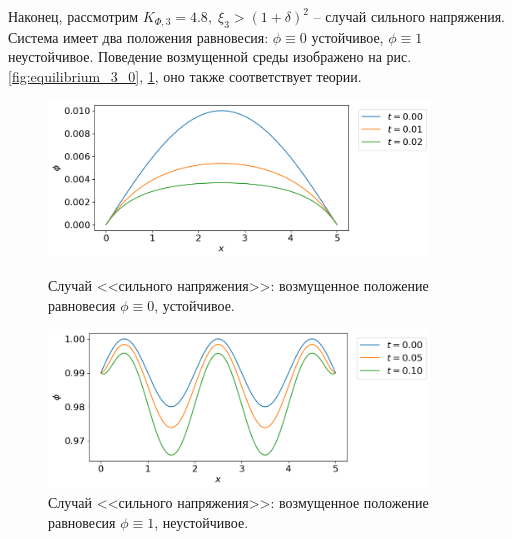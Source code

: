 Наконец, рассмотрим $K_{\Phi, 3} = 4.8, \; \xi_3 > (1 + \delta)^2$ -- случай сильного напряжения. Система имеет два положения равновесия: $\phi \equiv 0$ устойчивое, $\phi \equiv 1$ неустойчивое. Поведение возмущенной среды изображено на рис. \ref{fig:equilibrium_3_0}, \ref{fig:equilibrium_3_1}, оно также соответствует теории.

\begin{figure}[!t]
    \centering
    \includegraphics[width=0.9\textwidth]{figures/equilibrium_3_0.png}
    \vspace{-0.3cm}
    \caption{Случай <<сильного напряжения>>: возмущенное положение равновесия $\phi \equiv 0$, устойчивое.}
    \label{fig:equilibrium_3_0}
    \vspace{0.5cm}
    
    \includegraphics[width=0.9\textwidth]{figures/equilibrium_3_1.png}
    \vspace{-0.3cm}
    \caption{Случай <<сильного напряжения>>: возмущенное положение равновесия $\phi \equiv 1$, неустойчивое.}
    \label{fig:equilibrium_3_1}
\end{figure}